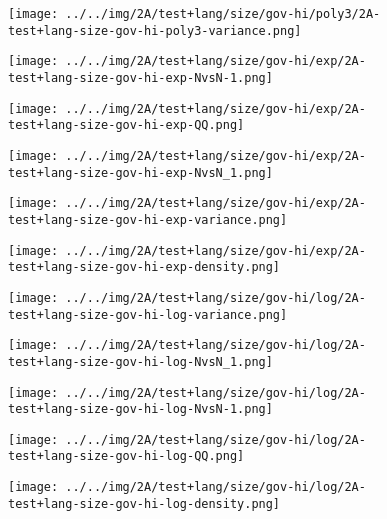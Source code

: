 \begin{figure}[H]
\centering	\texttt{[image: ../../img/2A/test+lang/size/gov-hi/poly3/2A-test+lang-size-gov-hi-poly3-variance.png]}
\end{figure}
\begin{figure}[H]
\centering	\texttt{[image: ../../img/2A/test+lang/size/gov-hi/exp/2A-test+lang-size-gov-hi-exp-NvsN-1.png]}
\end{figure}
\begin{figure}[H]
\centering	\texttt{[image: ../../img/2A/test+lang/size/gov-hi/exp/2A-test+lang-size-gov-hi-exp-QQ.png]}
\end{figure}
\begin{figure}[H]
\centering	\texttt{[image: ../../img/2A/test+lang/size/gov-hi/exp/2A-test+lang-size-gov-hi-exp-NvsN\_1.png]}
\end{figure}
\begin{figure}[H]
\centering	\texttt{[image: ../../img/2A/test+lang/size/gov-hi/exp/2A-test+lang-size-gov-hi-exp-variance.png]}
\end{figure}
\begin{figure}[H]
\centering	\texttt{[image: ../../img/2A/test+lang/size/gov-hi/exp/2A-test+lang-size-gov-hi-exp-density.png]}
\end{figure}
\begin{figure}[H]
\centering	\texttt{[image: ../../img/2A/test+lang/size/gov-hi/log/2A-test+lang-size-gov-hi-log-variance.png]}
\end{figure}
\begin{figure}[H]
\centering	\texttt{[image: ../../img/2A/test+lang/size/gov-hi/log/2A-test+lang-size-gov-hi-log-NvsN\_1.png]}
\end{figure}
\begin{figure}[H]
\centering	\texttt{[image: ../../img/2A/test+lang/size/gov-hi/log/2A-test+lang-size-gov-hi-log-NvsN-1.png]}
\end{figure}
\begin{figure}[H]
\centering	\texttt{[image: ../../img/2A/test+lang/size/gov-hi/log/2A-test+lang-size-gov-hi-log-QQ.png]}
\end{figure}
\begin{figure}[H]
\centering	\texttt{[image: ../../img/2A/test+lang/size/gov-hi/log/2A-test+lang-size-gov-hi-log-density.png]}
\end{figure}
